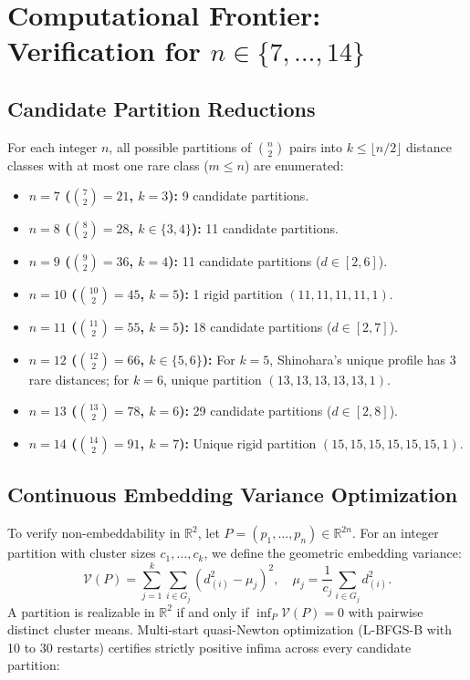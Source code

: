 \documentclass[11pt,reqno]{article}
\theoremstyle{definition}
\begin{document}
\section{Computational Frontier: Verification for $n \in \{7, \dots, 14\}$}

\subsection{Candidate Partition Reductions}
For each integer $n$, all possible partitions of $\binom{n}{2}$ pairs into $k \le \lfloor n/2 \rfloor$ distance classes with at most one rare class ($m \le n$) are enumerated:
\begin{itemize}
    \item \textbf{$n = 7$ ($\binom{7}{2} = 21$, $k = 3$):} 9 candidate partitions.
    \item \textbf{$n = 8$ ($\binom{8}{2} = 28$, $k \in \{3, 4\}$):} 11 candidate partitions.
    \item \textbf{$n = 9$ ($\binom{9}{2} = 36$, $k = 4$):} 11 candidate partitions ($d \in [2, 6]$).
    \item \textbf{$n = 10$ ($\binom{10}{2} = 45$, $k = 5$):} 1 rigid partition $(11, 11, 11, 11, 1)$.
    \item \textbf{$n = 11$ ($\binom{11}{2} = 55$, $k = 5$):} 18 candidate partitions ($d \in [2, 7]$).
    \item \textbf{$n = 12$ ($\binom{12}{2} = 66$, $k \in \{5, 6\}$):} For $k=5$, Shinohara's unique profile has 3 rare distances; for $k=6$, unique partition $(13, 13, 13, 13, 13, 1)$.
    \item \textbf{$n = 13$ ($\binom{13}{2} = 78$, $k = 6$):} 29 candidate partitions ($d \in [2, 8]$).
    \item \textbf{$n = 14$ ($\binom{14}{2} = 91$, $k = 7$):} Unique rigid partition $(15, 15, 15, 15, 15, 15, 1)$.
\end{itemize}

\subsection{Continuous Embedding Variance Optimization}
To verify non-embeddability in $\mathbb{R}^2$, let $P = (p_1, \dots, p_n) \in \mathbb{R}^{2n}$. For an integer partition with cluster sizes $c_1, \dots, c_k$, we define the geometric embedding variance:
\[
\mathcal{V}(P) = \sum_{j=1}^k \sum_{i \in G_j} \left( d_{(i)}^2 - \mu_j \right)^2, \quad \mu_j = \frac{1}{c_j} \sum_{i \in G_j} d_{(i)}^2.
\]
A partition is realizable in $\mathbb{R}^2$ if and only if $\inf_{P} \mathcal{V}(P) = 0$ with pairwise distinct cluster means. Multi-start quasi-Newton optimization (L-BFGS-B with 10 to 30 restarts) certifies strictly positive infima across every candidate partition:
\end{document}
